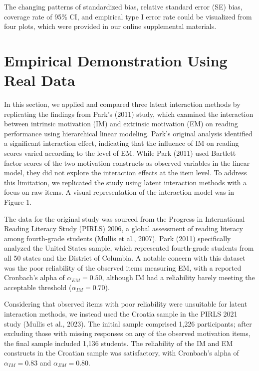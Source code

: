 \documentclass[
  man,mask]{apa6}
\begin{document}
The changing patterns of standardized bias, relative standard error (SE) bias, coverage rate of 95\% CI, and empirical type I error rate could be visualized from four plots, which were provided in our online supplemental materials.

\section{Empirical Demonstration Using Real Data}\label{empirical-demonstration-using-real-data}

In this section, we applied and compared three latent interaction methods by replicating the findings from Park's (2011) study, which examined the interaction between intrinsic motivation (IM) and extrinsic motivation (EM) on reading performance using hierarchical linear modeling. Park's original analysis identified a significant interaction effect, indicating that the influence of IM on reading scores varied according to the level of EM. While Park (2011) used Bartlett factor scores of the two motivation constructs as observed variables in the linear model, they did not explore the interaction effects at the item level. To address this limitation, we replicated the study using latent interaction methods with a focus on raw items. A visual representation of the interaction model was in Figure 1.

The data for the original study was sourced from the Progress in International Reading Literacy Study (PIRLS) 2006, a global assessment of reading literacy among fourth-grade students (Mullis et al., 2007). Park (2011) specifically analyzed the United States sample, which represented fourth-grade students from all 50 states and the District of Columbia. A notable concern with this dataset was the poor reliability of the observed items measuring EM, with a reported Cronbach's alpha of \(\alpha_{EM} = 0.50\), although IM had a reliability barely meeting the acceptable threshold (\(\alpha_{IM} = 0.70\)).

Considering that observed items with poor reliability were unsuitable for latent interaction methods, we instead used the Croatia sample in the PIRLS 2021 study (Mullis et al., 2023). The initial sample comprised 1,226 participants; after excluding those with missing responses on any of the observed motivation items, the final sample included 1,136 students. The reliability of the IM and EM constructs in the Croatian sample was satisfactory, with Cronbach's alpha of \(\alpha_{IM} = 0.83\) and \(\alpha_{EM} = 0.80\).
\end{document}
